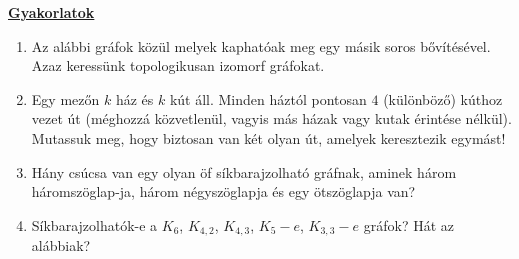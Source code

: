\documentclass[a4paper, 12pt]{article}
\begin{document}
{\bf\large\underline{Gyakorlatok}}

\begin{enumerate}
	\item Az alábbi gráfok közül melyek kaphatóak meg egy másik soros bővítésével. Azaz keressünk topologikusan izomorf gráfokat.
		\begin{figure}[h]
		\centering
			\begin{subfigure}[b]{0.15\textwidth}
				\centering
				\caption{}
				
			\end{subfigure}
			\begin{subfigure}[b]{0.15\textwidth}
				\centering
				\caption{}				
				
			\end{subfigure}
			\begin{subfigure}[b]{0.15\textwidth}
				\centering
				\caption{}				
				
			\end{subfigure}
		\centering
			\begin{subfigure}[b]{0.15\textwidth}
				\centering
				\caption{}	
				
			\end{subfigure}
			\begin{subfigure}[b]{0.15\textwidth}
				\centering
				\caption{}
				
			\end{subfigure}
			\begin{subfigure}[b]{0.15\textwidth}
				\centering
				\caption{}
				
			\end{subfigure}
		\end{figure}
	\item Egy mezőn $k$ ház és $k$ kút áll. Minden háztól pontosan $4$ (különböző) kúthoz vezet út (méghozzá közvetlenül, vagyis más házak vagy kutak érintése nélkül). Mutassuk meg, hogy biztosan van két olyan út, amelyek keresztezik egymást!
	\item Hány csúcsa van egy olyan öf síkbarajzolható gráfnak, aminek három háromszöglap-ja, három négyszöglapja és egy ötszöglapja van?
	\item Síkbarajzolhatók-e a $K_6$, $K_{4,2}$, $K_{4,3}$, $K_5 - e$, $K_{3,3} - e$ gráfok? Hát az alábbiak?
	\begin{figure}[h]
	\centering
		\begin{subfigure}[b]{0.3\textwidth}
			\centering
			\caption{}
			
		\end{subfigure}
		\begin{subfigure}[b]{0.3\textwidth}
			\centering
			\caption{}				
			
		\end{subfigure}
		\begin{subfigure}[b]{0.3\textwidth}
			\centering
			\caption{}				
			
		\end{subfigure}
		\begin{subfigure}[b]{0.3\textwidth}
			\centering
			\caption{}	
			
		\end{subfigure}		
		\begin{subfigure}[b]{0.3\textwidth}
			\centering
			\caption{}
			
		\end{subfigure}
		

\end{figure}
\end{enumerate}
\end{document}
